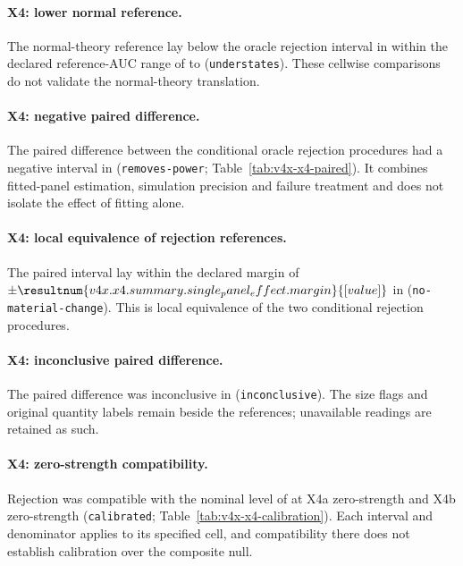 \paragraph{X4: lower normal reference.}
The normal-theory reference lay below the oracle rejection interval in   within the declared reference-AUC range of  to  (\texttt{understates}).
These cellwise comparisons do not validate the normal-theory translation.

\paragraph{X4: negative paired difference.}
The paired difference between the conditional oracle rejection procedures had a negative interval in   (\texttt{removes-power}; Table~\ref{tab:v4x-x4-paired}).
It combines fitted-panel estimation, simulation precision and failure treatment and does not isolate the effect of fitting alone.

\paragraph{X4: local equivalence of rejection references.}
The paired interval lay within the declared margin of $\pm\resultnum{v4x.x4.summary.single_panel_effect.margin}{[value]}$ in   (\texttt{no-material-change}).
This is local equivalence of the two conditional rejection procedures.

\paragraph{X4: inconclusive paired difference.}
The paired difference was inconclusive in   (\texttt{inconclusive}).
The size flags and original quantity labels remain beside the references; unavailable readings are retained as such.

\paragraph{X4: zero-strength compatibility.}
Rejection was compatible with the nominal level of  at  X4a zero-strength  and  X4b zero-strength  (\texttt{calibrated}; Table~\ref{tab:v4x-x4-calibration}).
Each interval and denominator applies to its specified cell, and compatibility there does not establish calibration over the composite null.

